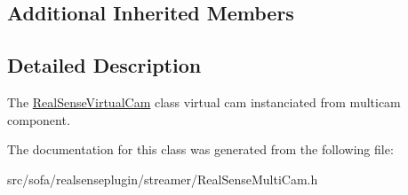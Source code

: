 \subsection*{Additional Inherited Members}


\subsection{Detailed Description}
The \hyperlink{classsofa_1_1rgbdtracking_1_1_real_sense_virtual_cam}{Real\+Sense\+Virtual\+Cam} class virtual cam instanciated from multicam component. 

The documentation for this class was generated from the following file\+:\begin{DoxyCompactItemize}
\item 
src/sofa/realsenseplugin/streamer/Real\+Sense\+Multi\+Cam.\+h\end{DoxyCompactItemize}
